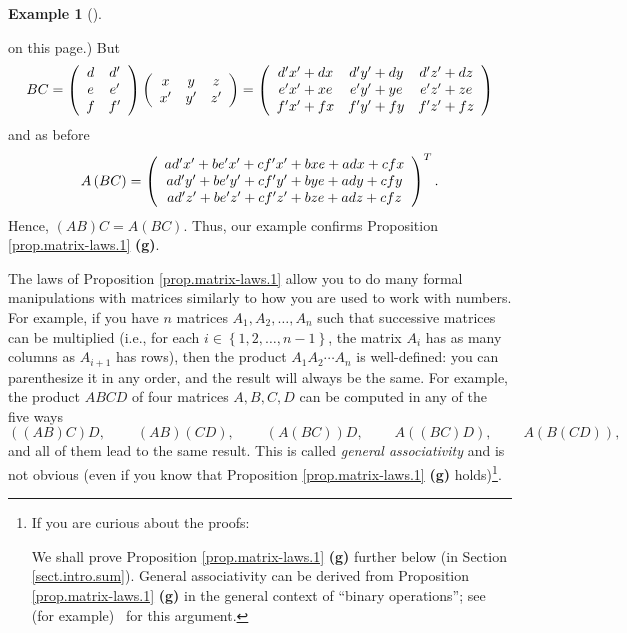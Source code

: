 \documentclass[numbers=enddot,12pt,final,onecolumn,notitlepage]{scrartcl}%
\theoremstyle{definition}
\newtheorem{exam}[theo]{Example}
\newenvironment{example}[1][]
{\begin{exam}[#1]\begin{leftbar}}
{\end{leftbar}\end{exam}}
\begin{document}
\begin{example}
on this page.) But
\[
BC=\left(
\begin{array}
[c]{cc}%
d & d^{\prime}\\
e & e^{\prime}\\
f & f^{\prime}%
\end{array}
\right)  \left(
\begin{array}
[c]{ccc}%
x & y & z\\
x^{\prime} & y^{\prime} & z^{\prime}%
\end{array}
\right)  =\left(
\begin{array}
[c]{ccc}%
d^{\prime}x^{\prime}+dx & d^{\prime}y^{\prime}+dy & d^{\prime}z^{\prime}+dz\\
e^{\prime}x^{\prime}+xe & e^{\prime}y^{\prime}+ye & e^{\prime}z^{\prime}+ze\\
f^{\prime}x^{\prime}+fx & f^{\prime}y^{\prime}+fy & f^{\prime}z^{\prime}+fz
\end{array}
\right)
\]
and as before
\[
A\left(  BC\right)  =\left(
\begin{array}
[c]{c}%
ad^{\prime}x^{\prime}+be^{\prime}x^{\prime}+cf^{\prime}x^{\prime
}+bxe+adx+cfx\\
ad^{\prime}y^{\prime}+be^{\prime}y^{\prime}+cf^{\prime}y^{\prime
}+bye+ady+cfy\\
ad^{\prime}z^{\prime}+be^{\prime}z^{\prime}+cf^{\prime}z^{\prime}+bze+adz+cfz
\end{array}
\right)  ^{T}.
\]
Hence, $\left(  AB\right)  C=A\left(  BC\right)  $. Thus, our example confirms
Proposition \ref{prop.matrix-laws.1} \textbf{(g)}.
\end{example}

The laws of Proposition \ref{prop.matrix-laws.1} allow you to do many formal
manipulations with matrices similarly to how you are used to work with
numbers. For example, if you have $n$ matrices $A_{1},A_{2},\ldots,A_{n}$ such
that successive matrices can be multiplied (i.e., for each $i\in\left\{
1,2,\ldots,n-1\right\}  $, the matrix $A_{i}$ has as many columns as $A_{i+1}$
has rows), then the product $A_{1}A_{2}\cdots A_{n}$ is well-defined: you can
parenthesize it in any order, and the result will always be the same. For
example, the product $ABCD$ of four matrices $A,B,C,D$ can be computed in any
of the five ways%
\[
\left(  \left(  AB\right)  C\right)  D,\ \ \ \ \ \ \ \ \ \ \left(  AB\right)
\left(  CD\right)  ,\ \ \ \ \ \ \ \ \ \ \left(  A\left(  BC\right)  \right)
D,\ \ \ \ \ \ \ \ \ \ A\left(  \left(  BC\right)  D\right)
,\ \ \ \ \ \ \ \ \ \ A\left(  B\left(  CD\right)  \right)  ,
\]
and all of them lead to the same result. This is called \textit{general
associativity} and is not obvious (even if you know that Proposition
\ref{prop.matrix-laws.1} \textbf{(g)} holds)\footnote{If you are curious about
the proofs:
\par
We shall prove Proposition \ref{prop.matrix-laws.1} \textbf{(g)} further below
(in Section \ref{sect.intro.sum}). General associativity can be derived from
Proposition \ref{prop.matrix-laws.1} \textbf{(g)} in the general context of
\textquotedblleft binary operations\textquotedblright; see (for
example)\ \cite{Zuker14} for this argument.}.
\end{document}
